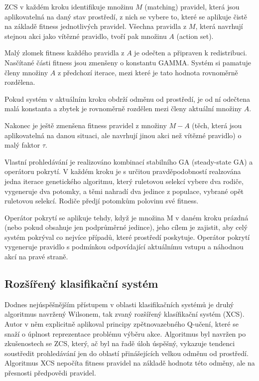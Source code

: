ZCS v každém kroku identifikuje množinu $M$ (matching) pravidel, která jsou aplikovatelná na daný stav prostředí, z nich se vybere to, které se aplikuje čistě na základě fitness jednotlivých pravidel. Všechna pravidla z $M$, která navrhují stejnou akci jako vítězné pravidlo, tvoří pak množinu $A$ (action set). 

Malý zlomek fitness každého pravidla z $A$ je odečten a připraven k redistribuci. Nasčítané části fitness jsou zmenšeny o konstantu GAMMA. Systém si pamatuje členy množiny $A$ z předchozí iterace, mezi které je tato hodnota rovnoměrně rozdělena. 

Pokud systém v aktuálním kroku obdrží odměnu od prostředí, je od ní odečtena malá konstanta a zbytek je rovnoměrně rozdělen mezi členy aktuální množiny $A$. 

Nakonec je ještě zmenšena fitness pravidel z množiny $M-A$ (těch, která jsou aplikovatelná na danou situaci, ale navrhují jinou akci než vítězné pravidlo) o malý faktor $\tau$. 

Vlastní prohledávání je realizováno kombinací stabilního GA (steady-state GA) a operátoru pokrytí. V každém kroku je s určitou pravděpodobností realzována jedna iterace genetického algoritmu, který ruletovou selekcí vybere dva rodiče, vygeneruje dva potomky, a těmi nahradí dva jedince z populace, vybrané opět ruletovou selekcí. Rodiče předjí potomkům polovinu své fitness.

Operátor pokrytí se aplikuje tehdy, když je množina M v daném kroku prázdná (nebo pokud obsahuje jen podprůměrné jedince), jeho cílem je zajistit, aby celý systém pokrýval co nejvíce případů, které prostředí poskytuje. Operátor pokrytí vygeneruje pravidlo s podmínkou odpovídající aktuálnímu vstupu a náhodnou akcí na pravé straně. 

\subsection{Rozšířený klasifikační systém}

Dodnes nejúspěšnějším přístupem v oblasti klasifikačních systémů je druhý algoritmus navržený Wilsonem, tak zvaný rozšířený klasífikační systém (XCS). Autor v něm explicitně aplikoval principy zpětnovazebného Q-učení, které se snaží o úplnost reprezentace problému výběru akce. Algoritmus byl navržen po zkušenostech se ZCS, který, ač byl na řadě úloh úspěšný, vykazuje tendenci soustředit prohledávání jen do oblastí přinášejících velkou odměnu od prostředí. 
Algoritmus XCS nepočíta fitness pravidel na základě hodnotz této odměny, ale na přesnosti předpovědi pravidel. 

